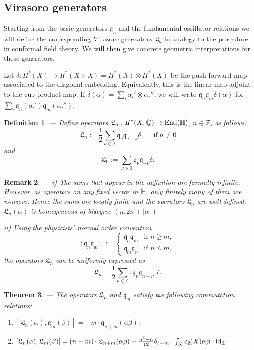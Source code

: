 \documentclass[twoside,11pt]{article}
\newtheorem{theorem}{Theorem}[section]
\newtheorem{definition}[theorem]{Definition}
\newtheorem{remark}[theorem]{Remark}
\newcommand{\IH}{{\mathbb H}}
\newcommand{\IQ}{{\mathbb Q}}
\newcommand{\IZ}{{\mathbb Z}}
\newcommand{\gothq}{{\mathfrak q}}
\newcommand{\gothL}{{\mathfrak L}}
\newcommand{\tensor}{\otimes}
\newcommand{\End}{{\rm End}}
\newcommand{\qq}{\gothq}
\newcommand{\LL}{\gothL}
\newcommand{\id}{{\rm id}}
\begin{document}
\subsection{Virasoro generators} 
 
Starting from the basic generators $\qq_n$ and the fundamental oscillator 
relations we will define the corresponding Virasoro generators $\LL_n$
in analogy to the procedure in conformal field theory. We will then give
concrete geometric interpretations for these generators.

Let $\delta:H^*(X)\to H^*(X\times X)=H^*(X)\tensor H^*(X)$ be the push-forward
map associated to the diagonal embedding. Equivalently, this is the linear map 
adjoint to the cup-product map.
If $\delta(\alpha)=\sum_i\alpha_i'\tensor\alpha_i''$, we will write
$\qq_n\qq_m\delta(\alpha)$ for $\sum_i\qq_n(\alpha_i')\qq_m(\alpha_i'').$

\begin{definition}--- Define operators $\LL_n:H^*(X;\IQ)\to\End(\IH)$,
$n\in\IZ$, as follows:  $$\LL_n:=\frac{1}{2}\sum_{\nu\in\IZ}\qq_\nu\qq_{n-\nu}\delta,\quad\mbox{ if } n\neq0$$
and
$$\LL_0:=\sum_{\nu>0}\qq_\nu\qq_{-\nu}\delta.$$
\end{definition}

\begin{remark}--- i)
The sums that appear in the definition are formally infinite.
However, as operators on any fixed vector in $\IH$, only finitely many of them
are nonzero. Hence the sums are locally finite and the operators $\LL_n$ 
are well-defined. $\LL_n(\alpha)$ is homogeneous of bidegree $(n,2n+|\alpha|)$
 
ii) Using the physicists' normal order convention
$$:\qq_n\qq_m:\,\,:=\left\{
\begin{array}{cl}
\qq_n\qq_m&\mbox{if }n\geq m,\\
\qq_m\qq_n&\mbox{if }n\leq m,
\end{array}\right.$$
the operators $\LL_n$ can be uniformly expressed as
$$\LL_n=\frac{1}{2}\sum_{\nu\in\IZ}:\qq_\nu\qq_{n-\nu}:\delta.$$
\end{remark}



\begin{theorem}\label{Lqcommutator}---
The operators $\LL_n$ and $\qq_m$ satisfy the following
commutation relations:
\begin{enumerate}
\item $[\LL_n(\alpha),\qq_m(\beta)]=-m\cdot\qq_{n+m}(\alpha\beta).$
\item $[\LL_n(\alpha),\LL_m(\beta)]=(n-m)\cdot\LL_{n+m}(\alpha\beta)-\frac{n^3-n}{12}\delta_{n+m}\cdot\int_Xc_2(X)\alpha\beta\cdot\id_{\IH}.$
\end{enumerate}
\end{theorem}
\end{document}
